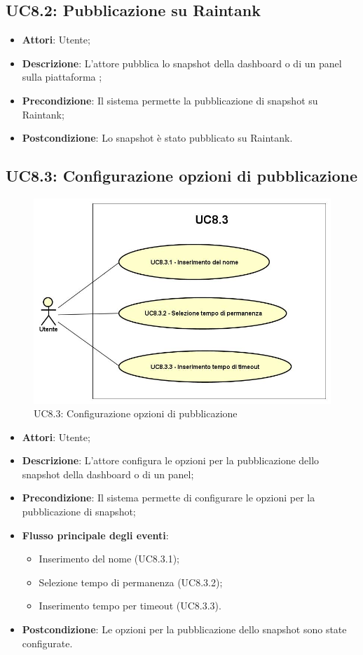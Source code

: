 \subsection{UC8.2: Pubblicazione su Raintank}
\begin{itemize}
	\item \textbf{Attori}: Utente;
	\item \textbf{Descrizione}: L'attore pubblica lo snapshot della dashboard o di un panel sulla piattaforma ;
	\item \textbf{Precondizione}: Il sistema permette la pubblicazione di snapshot su Raintank;
	\item \textbf{Postcondizione}: Lo snapshot è stato pubblicato su Raintank.
\end{itemize}

\subsection{UC8.3: Configurazione opzioni di pubblicazione}
\begin{figure} [H]
	\centering
	\includegraphics[scale=0.45]{Img/UC8-3}
	\caption{UC8.3: Configurazione opzioni di pubblicazione}\label{}
\end{figure}
\begin{itemize}
	\item \textbf{Attori}: Utente;
	\item \textbf{Descrizione}: L'attore configura le opzioni per la pubblicazione dello snapshot della dashboard o di un panel;
	\item \textbf{Precondizione}: Il sistema permette di configurare le opzioni per la pubblicazione di snapshot;
	\item \textbf{Flusso principale degli eventi}:
		\begin{itemize}
		\item Inserimento del nome (UC8.3.1);
		\item Selezione tempo di permanenza (UC8.3.2);
		\item Inserimento tempo per timeout (UC8.3.3).
	\end{itemize}
	\item \textbf{Postcondizione}: Le opzioni per la pubblicazione dello snapshot sono state configurate.
\end{itemize}

